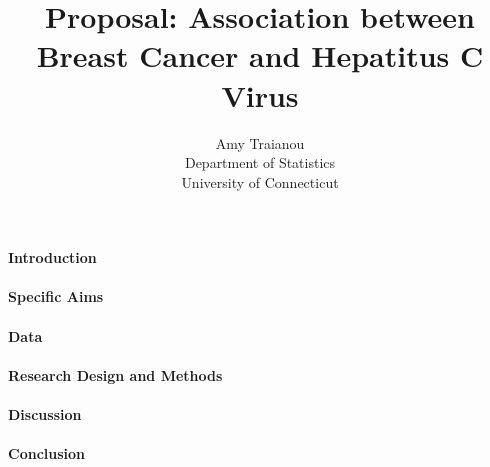 \documentclass[12pt]{article}
\title{Proposal: Association between Breast Cancer and Hepatitus C Virus}
\author{Amy Traianou\\
  Department of Statistics\\
  University of Connecticut
}
\begin{document}
\maketitle


\paragraph{Introduction}

\citep{dwivedi2017analysis}


\paragraph{Specific Aims}
\lipsum[2]

\paragraph{Data}
\lipsum[3]

\paragraph{Research Design and Methods}
\lipsum[4]

\paragraph{Discussion}
\lipsum[5] \citep{wild2004global}

\paragraph{Conclusion}
\lipsum[1]




\end{document}
